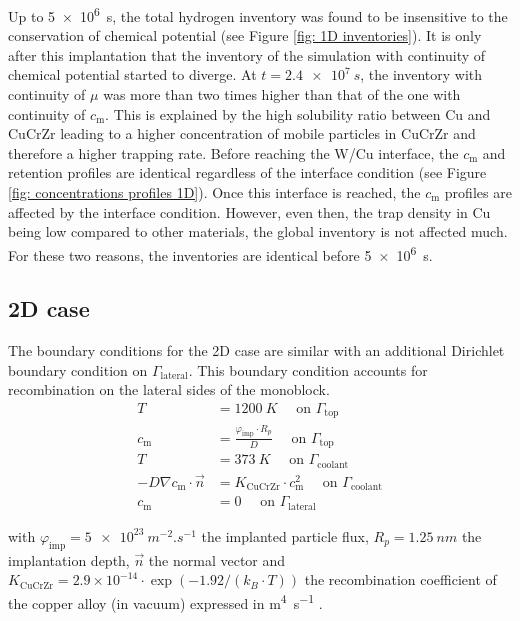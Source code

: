 Up to \SI{5e6}{s}, the total hydrogen inventory was found to be insensitive to the conservation of chemical potential (see Figure \ref{fig: 1D inventories}).
It is only after this implantation that the inventory of the simulation with continuity of chemical potential started to diverge.
At $t=\SI{2.4e7}{s}$, the inventory with continuity of $\mu$ was more than two times higher than that of the one with continuity of $c_\mathrm{m}$.
This is explained by the high solubility ratio between Cu and CuCrZr leading to a higher concentration of mobile particles in CuCrZr and therefore a higher trapping rate.
Before reaching the W/Cu interface, the $c_\mathrm{m}$ and retention profiles are identical regardless of the interface condition (see Figure \ref{fig: concentrations profiles 1D}).
Once this interface is reached, the $c_\mathrm{m}$ profiles are affected by the interface condition.
However, even then, the trap density in Cu being low compared to other materials, the global inventory is not affected much.
For these two reasons, the inventories are identical before \SI{5e6}{s}.

\subsection{2D case}
The boundary conditions for the 2D case are similar with an additional Dirichlet boundary condition on $\Gamma_\mathrm{lateral}$.
This boundary condition accounts for recombination on the lateral sides of the monoblock.
\begin{subequations}
    \begin{align}
        T &=  \SI{1200}{K}\quad \text { on } \Gamma_\mathrm{top}\\
        c_\mathrm{m} &=  \frac{\varphi_\mathrm{imp} \cdot R_p}{D}\quad \text { on } \Gamma_\mathrm{top}\\
        T &= \SI{373}{K}\quad \text { on } \Gamma_\mathrm{coolant}\\
        -D \nabla c_\mathrm{m} \cdot \vec{n} &= K_\mathrm{CuCrZr} \cdot c_\mathrm{m}^{2} \quad \text { on } \Gamma_\mathrm{coolant} \\
        c_\mathrm{m} &= 0 \quad \text { on } \Gamma_\mathrm{lateral}
    \end{align}
\end{subequations}

with $\varphi_\mathrm{imp} = \SI{5e23}{m^{-2}.s^{-1}}$ the implanted particle flux, $R_p = \SI{1.25}{nm}$ the implantation depth, $\vec{n}$ the normal vector and $K_\mathrm{CuCrZr} = 2.9 \times 10^{-14}\cdot \exp{(-1.92/(k_B\cdot T))}$ the recombination coefficient of the copper alloy (in vacuum) expressed in \si{m^4.s^{-1}} .


